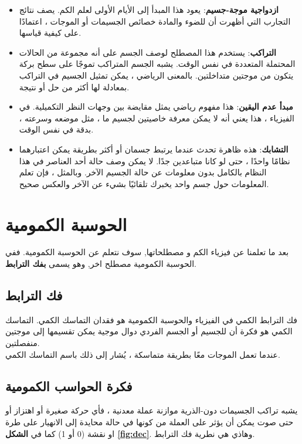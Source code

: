 \documentclass[a4paper,12pt,openright,twoside]{book}
\begin{document}
\begin{itemize}
	\item \textbf{ازدواجية موجة-جسيم\dash {}}: يعود هذا المبدأ إلى الأيام الأولى لعلم الكم. يصف نتائج التجارب التي أظهرت أن للضوء والمادة خصائص الجسيمات أو الموجات ، اعتمادًا على كيفية قياسها.
	\item \textbf{التراكب\dash {}}: يستخدم هذا المصطلح لوصف الجسم على أنه مجموعة من الحالات المحتملة المتعددة في نفس الوقت. يشبه الجسم المتراكب تموجًا على سطح بركة يتكون من موجتين متداخلتين. بالمعنى الرياضي ، يمكن تمثيل الجسيم في التراكب بمعادلة لها أكثر من حل أو نتيجة.
	\item \textbf{مبدأ عدم اليقين\dash {}}: هذا مفهوم رياضي يمثل مقايضة بين وجهات النظر التكميلية. في الفيزياء ، هذا يعني أنه لا يمكن معرفة خاصيتين لجسيم ما ، مثل موضعه وسرعته ، بدقة في نفس الوقت.
	\item \textbf{التشابك\dash {}}: هذه ظاهرة تحدث عندما يرتبط جسمان أو أكثر بطريقة يمكن اعتبارهما نظامًا واحدًا ، حتى لو كانا متباعدين جدًا. لا يمكن وصف حالة أحد العناصر في هذا النظام بالكامل بدون معلومات عن حالة الجسيم الآخر. وبالمثل ، فإن تعلم المعلومات حول جسم واحد يخبرك تلقائيًا بشيء عن الآخر والعكس صحيح.
\end{itemize} \newpage



\section{الحوسبة الكمومية}

بعد ما تعلمنا عن فيزياء الكم و مصطلحاتها, سوف نتعلم عن الحوسبة الكمومية. ففي الحوسبة الكمومية مصطلح اخر, وهو يسمى \textbf{بفك الترابط\dash {}}.

\subsection{فك الترابط}
فك الترابط الكمي في الفيزياء والحوسبة الكمومية هو فقدان التماسك الكمي. التماسك الكمي هو فكرة أن للجسيم أو الجسم الفردي دوال موجية يمكن تقسيمها إلى موجتين منفصلتين. \\

عندما تعمل الموجات معًا بطريقة متماسكة ، يُشار إلى ذلك باسم التماسك الكمي.


\subsection{فكرة الحواسب الكمومية}
يشبه تراكب الجسيمات دون-الذرية موازنة عملة معدنية ، فأي حركة صغيرة أو اهتزاز أو حتى صوت يمكن أن يؤثر على العملة من كونها في حالة محايدة إلى الانهيار على طرة او نقشة (0 أو 1) كما في \textbf{الشكل \ref{fig:dec}}. وهاذي هي نطرية فك الترابط.
\end{document}
